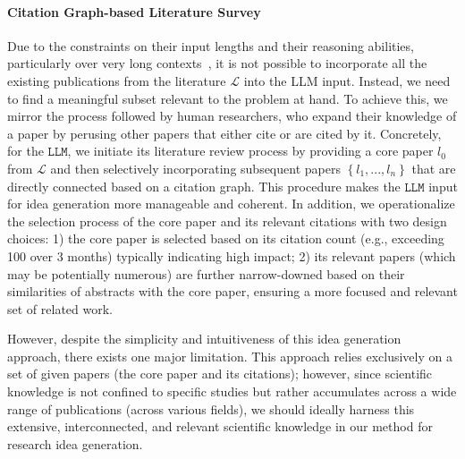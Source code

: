\documentclass[11pt]{article}
\begin{document}
\paragraph{Citation Graph-based Literature Survey}
Due to the constraints on their input lengths and their reasoning abilities, particularly over very long contexts~\cite{LostITM}, it is not possible to incorporate all the existing publications from the literature $\mathcal{L}$ into the LLM input. Instead, we need to find a meaningful subset relevant to the problem at hand. To achieve this, we mirror the process followed by human researchers, who expand their knowledge of a paper by perusing other papers that either cite or are cited by it. Concretely, for the $\texttt{LLM}$, we initiate its literature review process by providing a core paper $l_0$ from $\mathcal{L}$ and then selectively incorporating subsequent papers $\left\{ l_1, ..., l_n \right\}$ that are directly connected based on a citation graph. This procedure makes the $\texttt{LLM}$ input for idea generation more manageable and coherent. In addition, we operationalize the selection process of the core paper and its relevant citations with two design choices: 1) the core paper is selected based on its citation count (e.g., exceeding 100 over 3 months) typically indicating high impact; 2) its relevant papers (which may be potentially numerous) are further narrow-downed based on their similarities of abstracts with the core paper, ensuring a more focused and relevant set of related work.

However, despite the simplicity and intuitiveness of this idea generation approach, there exists one major limitation. This approach relies exclusively on a set of given papers (the core paper and its citations); however, since scientific knowledge is not confined to specific studies but rather accumulates across a wide range of publications (across various fields), we should ideally harness this extensive, interconnected, and relevant scientific knowledge in our method for research idea generation.
\end{document}
